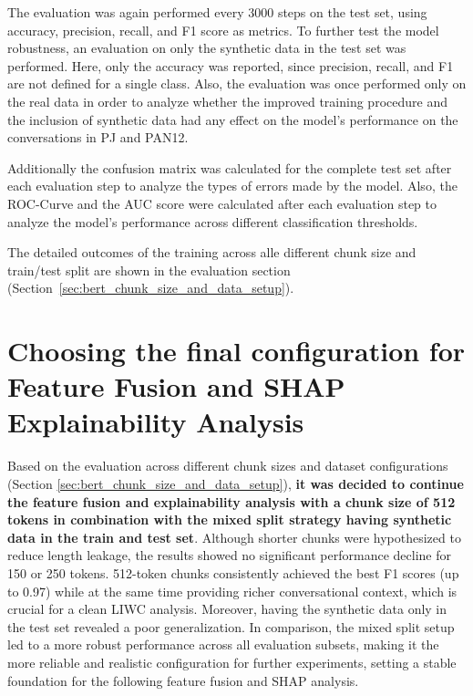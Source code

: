 The evaluation was again performed every 3000 steps on the test set, using accuracy, precision, recall, and F1 score as metrics. To further test the model robustness, an evaluation on only the synthetic data in the test set was performed. Here, only the accuracy was reported, since precision, recall, and F1 are not defined for a single class. Also, the evaluation was once performed only on the real data in order to analyze whether the improved training procedure and the inclusion of synthetic data had any effect on the model’s performance on the conversations in PJ and PAN12.

Additionally the confusion matrix was calculated for the complete test set after each evaluation step to analyze the types of errors made by the model. Also, the ROC-Curve and the AUC score were calculated after each evaluation step to analyze the model's performance across different classification thresholds.

The detailed outcomes of the training across alle different chunk size and train/test split are shown in the evaluation section (Section~\ref{sec:bert_chunk_size_and_data_setup}).

\section{Choosing the final configuration for Feature Fusion and SHAP Explainability Analysis} 


Based on the evaluation across different chunk sizes and dataset configurations (Section \ref{sec:bert_chunk_size_and_data_setup}), \textbf{it was decided to continue the feature fusion and explainability analysis with a chunk size of 512 tokens in combination with the mixed split strategy having synthetic data in the train and test set}. Although shorter chunks were hypothesized to reduce length leakage, the results showed no significant performance decline for 150 or 250 tokens. 512-token chunks consistently achieved the best F1 scores (up to 0.97) while at the same time providing richer conversational context, which is crucial for a clean LIWC analysis. Moreover, having the synthetic data only in the test set revealed a poor generalization. In comparison, the mixed split setup led to a more robust performance across all evaluation subsets, making it the more reliable and realistic configuration for further experiments, setting a stable foundation for the following feature fusion and SHAP analysis.


